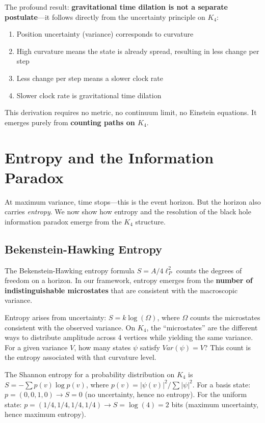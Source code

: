 \documentclass[11pt,a4paper]{book}
\def\text#1{#1}%
\begin{document}
The profound result: \textbf{gravitational time dilation is not a separate 
postulate}---it follows directly from the uncertainty principle on $K_4$:

\begin{enumerate}
\item Position uncertainty (variance) corresponds to curvature
\item High curvature means the state is already spread, resulting in less change per step
\item Less change per step means a slower clock rate
\item Slower clock rate is gravitational time dilation
\end{enumerate}

This derivation requires no metric, no continuum limit, no Einstein equations.
It emerges purely from \textbf{counting paths on $K_4$}.

\chapter{Entropy and the Information Paradox}
\label{chap:entropy-information}

At maximum variance, time stops---this is the event horizon. But the horizon also carries \emph{entropy}. We now show how entropy and the resolution of the black hole information paradox emerge from the $K_4$ structure.

\section{Bekenstein-Hawking Entropy}

The Bekenstein-Hawking entropy formula $S = A/4\ell_P^2$ counts the degrees of freedom on a horizon.
In our framework, entropy emerges from the \textbf{number of indistinguishable
microstates} that are consistent with the macroscopic variance.

Entropy arises from uncertainty: $S = k \log(\Omega)$, where $\Omega$ counts the microstates consistent with the observed variance. On $K_4$, the ``microstates'' are the different ways to distribute amplitude across 4 vertices while yielding the same variance. For a given variance $V$, how many states $\psi$ satisfy $\text{Var}(\psi) = V$? This count is the entropy associated with that curvature level.

The Shannon entropy for a probability distribution on $K_4$ is $S = -\sum p(v) \log p(v)$, where $p(v) = |\psi(v)|^2 / \sum|\psi|^2$. For a basis state: $p = (0,0,1,0) \to S = 0$ (no uncertainty, hence no entropy). For the uniform state: $p = (1/4,1/4,1/4,1/4) \to S = \log(4) = 2$ bits (maximum uncertainty, hence maximum entropy).
\end{document}
